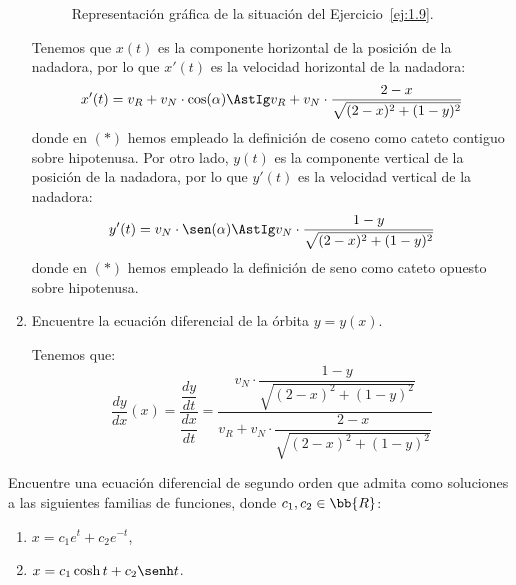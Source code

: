 \begin{ejercicio}
\begin{enumerate}
\begin{figure}[H]
            \caption{Representación gráfica de la situación del Ejercicio~\ref{ej:1.9}.}
            \label{fig:ej1.9}
        \end{figure}
        
        Tenemos que $x(t)$ es la componente horizontal de la posición de la nadadora, por lo que $x'(t)$ es la velocidad horizontal de la nadadora:
        \begin{equation*}
            x'(t) = v_R + v_N \cdot \cos(\alpha) \AstIg
            v_R + v_N \cdot \dfrac{2 - x}{\sqrt{(2 - x)^2 + (1 - y)^2}}
        \end{equation*}
        donde en $(\ast)$ hemos empleado la definición de coseno como cateto contiguo sobre hipotenusa. Por otro lado, $y(t)$ es la componente vertical de la posición de la nadadora, por lo que $y'(t)$ es la velocidad vertical de la nadadora:
        \begin{equation*}
            y'(t) = v_N \cdot \sen(\alpha) \AstIg v_N \cdot \dfrac{1 - y}{\sqrt{(2 - x)^2 + (1 - y)^2}}
        \end{equation*}
        donde en $(\ast)$ hemos empleado la definición de seno como cateto opuesto sobre hipotenusa.
        
        \item Encuentre la ecuación diferencial de la órbita \(y = y(x)\).
        
        Tenemos que:
        \begin{equation*}
            \dfrac{dy}{dx}(x) = \dfrac{\dfrac{dy}{dt}}{\dfrac{dx}{dt}} = \dfrac{v_N \cdot \dfrac{1 - y}{\sqrt{(2 - x)^2 + (1 - y)^2}}}{v_R + v_N \cdot \dfrac{2 - x}{\sqrt{(2 - x)^2 + (1 - y)^2}}}
        \end{equation*}
    \end{enumerate}
\end{ejercicio}


\begin{ejercicio}
    Encuentre una ecuación diferencial de segundo orden que admita como soluciones a las siguientes familias de funciones, donde \(c_1, c_2 \in \bb{R}\):
    \begin{enumerate}
        \item \(x = c_1e^t + c_2e^{-t}\),
        \item \(x = c_1\cosh t + c_2\senh t\).
    \end{enumerate}
\end{ejercicio}


